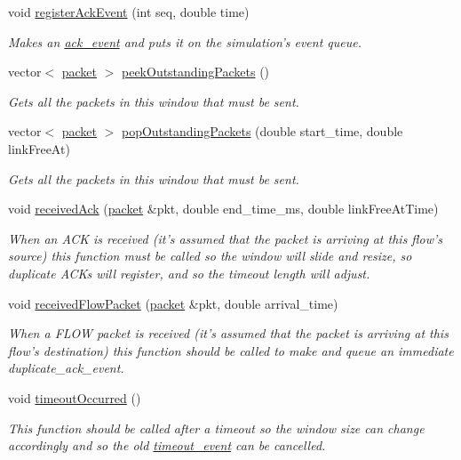 \begin{DoxyCompactItemize}
void \hyperlink{classnetflow_a5865695e5360027ce36e047b3368ff25}{register\-Ack\-Event} (int seq, double time)
\begin{DoxyCompactList}\small\item\em Makes an {\ttfamily \hyperlink{classack__event}{ack\-\_\-event}} and puts it on the simulation's event queue. \end{DoxyCompactList}\item 
vector$<$ \hyperlink{classpacket}{packet} $>$ \hyperlink{classnetflow_ad9974ffa5f9b264b561355c07bc0bd9f}{peek\-Outstanding\-Packets} ()
\begin{DoxyCompactList}\small\item\em Gets all the packets in this window that must be sent. \end{DoxyCompactList}\item 
vector$<$ \hyperlink{classpacket}{packet} $>$ \hyperlink{classnetflow_ae072b9c8069401bbc45e6ad9853eb45f}{pop\-Outstanding\-Packets} (double start\-\_\-time, double link\-Free\-At)
\begin{DoxyCompactList}\small\item\em Gets all the packets in this window that must be sent. \end{DoxyCompactList}\item 
void \hyperlink{classnetflow_a7d2582540a1cc34a7fc5b1c6ce41d329}{received\-Ack} (\hyperlink{classpacket}{packet} \&pkt, double end\-\_\-time\-\_\-ms, double link\-Free\-At\-Time)
\begin{DoxyCompactList}\small\item\em When an A\-C\-K is received (it's assumed that the packet is arriving at this flow's source) this function must be called so the window will slide and resize, so duplicate A\-C\-Ks will register, and so the timeout length will adjust. \end{DoxyCompactList}\item 
void \hyperlink{classnetflow_a3fab65a6f9fbfe3f54af066d260cd0b8}{received\-Flow\-Packet} (\hyperlink{classpacket}{packet} \&pkt, double arrival\-\_\-time)
\begin{DoxyCompactList}\small\item\em When a F\-L\-O\-W packet is received (it's assumed that the packet is arriving at this flow's destination) this function should be called to make and queue an immediate duplicate\-\_\-ack\-\_\-event. \end{DoxyCompactList}\item 
void \hyperlink{classnetflow_ad914b2fc48fd4727464619823b09a856}{timeout\-Occurred} ()
\begin{DoxyCompactList}\small\item\em This function should be called after a timeout so the window size can change accordingly and so the old \hyperlink{classtimeout__event}{timeout\-\_\-event} can be cancelled. \end{DoxyCompactList}\end{DoxyCompactItemize}
